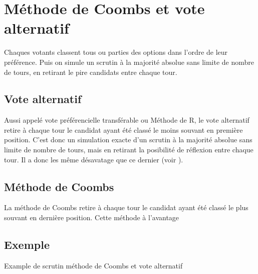 \documentclass[../report]{subfiles}
\begin{document}
  \section{Méthode de Coombs et vote alternatif}

  Chaques votants classent tous ou parties des options dans l'ordre de leur préférence.
  Puis on simule un scrutin à la majorité absolue sans limite de nombre de tours, en retirant le pire candidats
  entre chaque tour.

  \subsection{Vote alternatif}
  Aussi appelé vote préférencielle transférable ou Méthode de R, le vote alternatif retire à chaque 
  tour le candidat ayant été classé le moins souvant en première position.
  C'est donc un simulation exacte d'un scrutin à la majorité absolue sans limite de nombre de tours, 
  mais en retirant la posibilité de réflexion entre chaque tour. 
  Il a donc les même désavatage que ce dernier (voir ).

  \subsection{Méthode de Coombs}
  La méthode de Coombs retire à chaque tour le candidat ayant été classé le plus souvant en dernière position.
  Cette méthode à l'avantage 

  \subsection{Exemple}

  \begin{table}[h]
    \begin{center}
      \caption{Example de scrutin méthode de Coombs et vote alternatif}%
      \label{fig:diff:coombs:caslim1}
      \\[1em]
    \end{center}
  \end{table}
\end{document}
